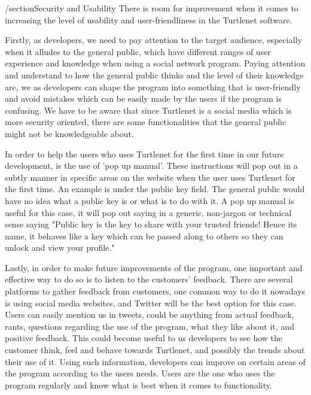 /section{Security and Usability}
There is room for improvement when it comes to increasing the level of usability 
and user-friendliness in the Turtlenet software. 

Firstly, as developers, we need to pay attention to the target audience, especially 
when it alludes to the general public, which have different ranges of user experience 
and knowledge when using a social network program. Paying attention and understand 
to how the general public thinks and the level of their knowledge are, we as developers 
can shape the program into something that is user-friendly and avoid mistakes which 
can be easily made by the users if the program is confusing. We have to be aware that 
since Turtlenet is a social media which is more security oriented, there are some 
functionalities that the general public might not be knowledgeable about.

In order to help the users who uses Turtlenet for the first time in our future 
development, is the use of 'pop up manual'. These instructions will pop out in a 
subtly manner in specific areas on the website when the user uses Turtlenet for 
the first time. An example is under the public key field. The general public would 
have no idea what a public key is or what is to do with it. A pop up manual is useful 
for this case, it will pop out saying in a generic, non-jargon or technical sense 
saying "Public key is the key to share with your trusted friends! Hence its name, it 
behaves like a key which can be passed along to others so they can unlock and view 
your profile."

Lastly, in order to make future improvements of the program, one important and effective 
way to do so is to listen to the customers' feedback. There are several platforms to 
gather feedback from customers, one common way to do it nowadays is using social media 
websites, and Twitter will be the best option for this case. Users can easily mention us 
in tweets, could be anything from actual feedback, rants, questions regarding the use of 
the program, what they like about it, and positive feedback. This could become useful to 
us developers to see how the customer think, feel and behave towards Turtlenet, and 
possibly the trends about their use of it. Using such information, developers can improve 
on certain areas of the program according to the users needs. Users are the one who uses 
the program regularly and know what is best when it comes to functionality. 